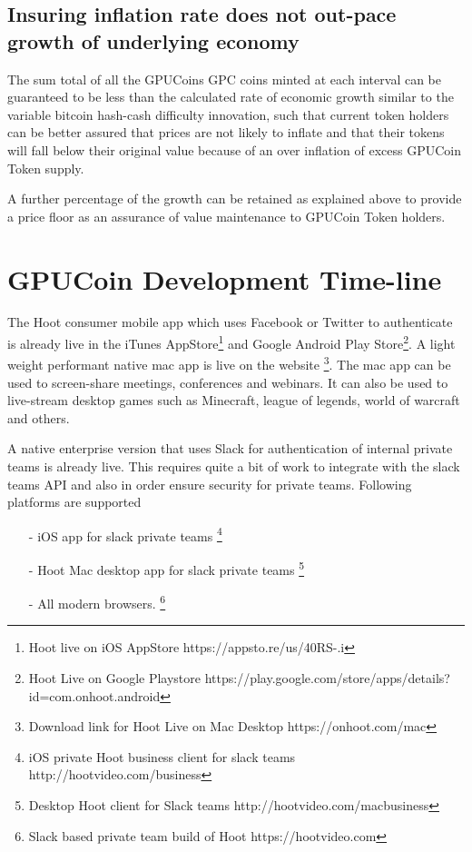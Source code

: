 \documentclass{article}
\begin{document}
\subsection{Insuring inflation rate does not out-pace growth of underlying economy}
The sum total of all the GPUCoins GPC coins minted at each interval can be guaranteed to be less than the calculated rate of economic growth similar to the variable bitcoin hash-cash difficulty innovation, such that current token holders can be better assured that prices are not likely to inflate and that their tokens will fall below their original value because of an over inflation of excess GPUCoin Token supply.

A further percentage of the growth can be retained as explained above to provide a price floor as an assurance of value maintenance to GPUCoin Token holders. 

\section{GPUCoin Development Time-line}
The Hoot consumer mobile app which uses Facebook or Twitter to authenticate is already live in the iTunes AppStore\footnote{Hoot live on iOS AppStore https://appsto.re/us/40RS-.i} and Google Android Play Store\footnote{Hoot Live on Google Playstore https://play.google.com/store/apps/details?id=com.onhoot.android}.
A light weight performant native mac app is live on
the website \footnote{Download link for Hoot Live on Mac Desktop https://onhoot.com/mac}. The mac app can be used to screen-share meetings, conferences and webinars. It can also be used to live-stream desktop games such as Minecraft, league of legends, world of warcraft and others.

A native enterprise version that uses Slack for authentication of internal private teams is already live.
 This requires quite a bit of work to integrate with the slack teams API and also in order ensure security for private teams. Following platforms are supported
\begin{itemize}

\item[-]iOS app for slack private teams \footnote{ iOS private Hoot business client for slack teams http://hootvideo.com/business}
\item[-]Hoot Mac desktop app for slack private teams \footnote{Desktop Hoot client for Slack teams http://hootvideo.com/macbusiness}
\item[-]All modern browsers. \footnote{Slack based private team build of Hoot https://hootvideo.com}
\end{itemize}
\end{document}
